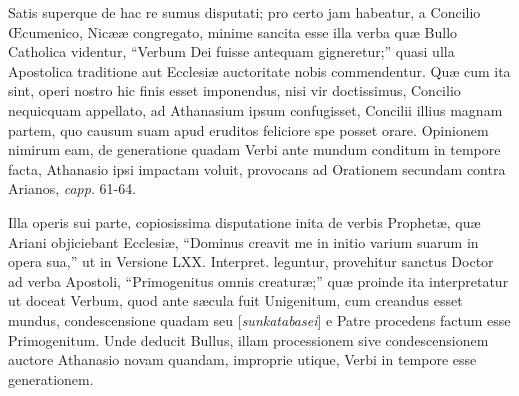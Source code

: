 Satis
superque de hac re sumus disputati; pro certo jam habeatur, a Concilio
Œcumenico, Nicææ congregato, minime sancita esse illa verba quæ
Bullo Catholica videntur, ``Verbum Dei fuisse antequam gigneretur;''
quasi ulla Apostolica traditione aut Ecclesiæ auctoritate nobis
commendentur. Quæ cum ita sint, operi nostro hic finis esset
imponendus, nisi vir doctissimus, Concilio nequicquam appellato, ad
Athanasium ipsum confugisset, Concilii illius magnam partem, quo
causum suam apud eruditos feliciore spe posset orare. Opinionem
nimirum eam, de generatione quadam Verbi ante mundum conditum in
tempore facta, Athanasio ipsi impactam voluit, provocans ad Orationem
secundam contra Arianos, \emph{capp}. 61-64.

Illa operis
sui parte, copiosissima disputatione inita de verbis Prophetæ, quæ
Ariani objiciebant Ecclesiæ, ``Dominus creavit me in initio varium
suarum in opera sua,'' ut in Versione LXX.
Interpret. leguntur, provehitur sanctus Doctor ad verba Apostoli, ``Primogenitus omnis
creaturæ;'' quæ proinde ita interpretatur ut
doceat Verbum, quod ante sæcula fuit Unigenitum, cum creandus esset
mundus, condescensione quadam seu [\emph{sunkatabasei}] e Patre
procedens factum esse Primogenitum. Unde deducit Bullus, illam
processionem sive condescensionem auctore Athanasio novam quandam,
improprie utique, Verbi in tempore esse generationem.

